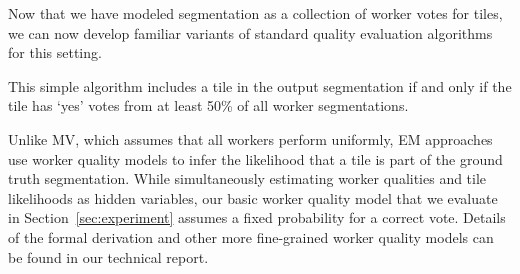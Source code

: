 \par Now that we have modeled segmentation as a collection of worker votes for tiles, we can now develop familiar variants of standard quality evaluation algorithms for this setting.

\par \noindent This simple algorithm includes a tile in the output segmentation if and only if the tile has `yes' votes from at least 50\% of all worker segmentations.

\par \noindent Unlike MV, which assumes that all workers perform uniformly, EM approaches use worker quality models to infer the likelihood that a tile is part of the ground truth segmentation. While simultaneously estimating worker qualities and tile likelihoods as hidden variables, 
our basic worker quality model that we evaluate in Section~\ref{sec:experiment} assumes a fixed probability for a correct vote.
Details of the formal derivation and other more fine-grained worker quality models can be found in our technical report.

